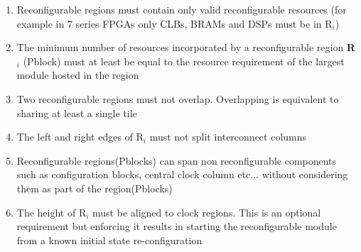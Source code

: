 \begin{enumerate}
\item Reconfigurable regions must contain only valid reconfigurable resources (for example in 7 series FPGAs only CLBs, BRAMs and DSPs must be in R$_i$)
\item The minimum number of resources incorporated by a reconfigurable region \textbf{R$_i$} (Pblock) must at least be equal to the resource requirement of the largest module hosted in the region

\item Two reconfigurable regions must not overlap. Overlapping is equivalent to sharing at least a single tile

\item The left and right edges of R$_i$ must not split interconnect columns 

\item Reconfigurable regions(Pblocks) can span non reconfigurable components such as configuration blocks, central clock column etc... without considering them as part of the region(Pblocks)

\item The height of R$_i$ must be aligned to clock regions. This is an optional requirement but enforcing it results in starting the reconfigurable module from a known initial state re-configuration

\end{enumerate}



\begin{comment}
The central clock column divides the FPGA into left and right regions as shown in the figure. But all the horizontally adjacent clock regions are combined into a single clock region to make the x axis W units wide. The y axis is H units high. Combining horizontally adjacent clock regions into a single clock region does

Reconfigurable regions need not necessarily be rectangular but assigning rectangular shapes to regions greatly reduces routing and placement challenges

The bit files are deployed in the FPGA configuration memory. 
\end{comment}